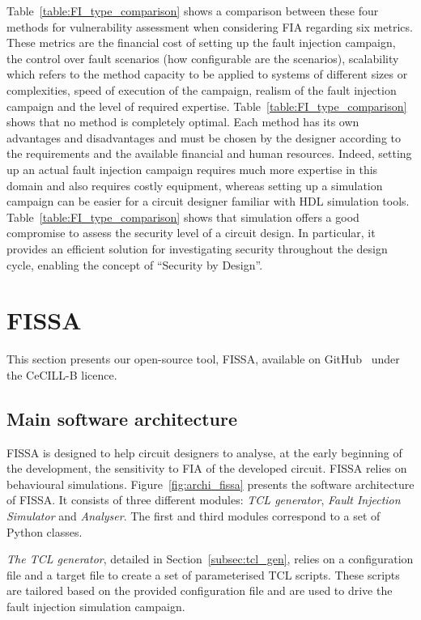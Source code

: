 Table~\ref{table:FI_type_comparison} shows a comparison between these four methods for vulnerability assessment when considering FIA regarding six metrics. These metrics are the financial cost of setting up the fault injection campaign, the control over fault scenarios (how configurable are the scenarios), scalability which refers to the method capacity to be applied to systems of different sizes or complexities, speed of execution of the campaign, realism of the fault injection campaign and the level of required expertise.
Table~\ref{table:FI_type_comparison} shows that no method is completely optimal. Each method has its own advantages and disadvantages and must be chosen by the designer according to the requirements and the available financial and human resources. Indeed, setting up an actual fault injection campaign requires much more expertise in this domain and also requires costly equipment, whereas setting up a simulation campaign can be easier for a circuit designer familiar with HDL simulation tools.
Table~\ref{table:FI_type_comparison} shows that simulation offers a good compromise to assess the security level of a circuit design. In particular, it provides an efficient solution for investigating security throughout the design cycle, enabling the concept of “Security by Design”.

\section{FISSA}
This section presents our open-source tool, FISSA, available on GitHub~\cite{fissa} under the CeCILL-B licence.

\subsection{Main software architecture}
FISSA is designed to help circuit designers to analyse, at the early beginning of the development, the sensitivity to FIA of the developed circuit. FISSA relies on behavioural simulations.
Figure~\ref{fig:archi_fissa} presents the software architecture of FISSA.
It consists of three different modules: \textit{TCL generator}, \textit{Fault Injection Simulator} and \textit{Analyser}. The first and third modules correspond to a set of Python classes.

\textit{The TCL generator}, detailed in Section~\ref{subsec:tcl_gen}, relies on a configuration file and a target file to create a set of parameterised TCL scripts. These scripts are tailored based on the provided configuration file and are used to drive the fault injection simulation campaign.


